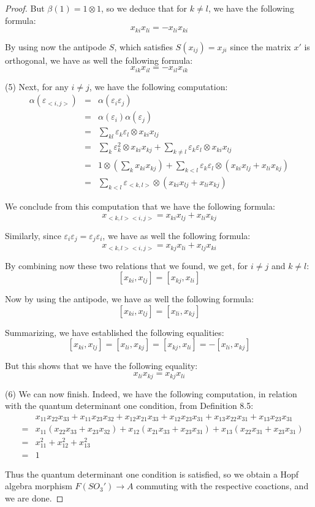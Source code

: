 \documentclass[10pt,a4paper]{amsart}
\begin{document}
\begin{proof}
But $\beta(1)=1\otimes1$, so we deduce that for $k\neq l$, we have the following formula:
$$x_{ki}x_{li}=-x_{li}x_{ki}$$

By using now the antipode $S$, which satisfies $S(x_{ij})=x_{ji}$ since the matrix $x'$ is orthogonal, we have as well the following formula:
$$x_{ik}x_{il}=-x_{il}x_{ik}$$

(5) Next, for any $i\neq j$, we have the following computation:
\begin{eqnarray*}
\alpha(\varepsilon_{<i,j>})
&=&\alpha(\varepsilon_i \varepsilon_j)\\
&=&\alpha(\varepsilon_i)\alpha(\varepsilon_j)\\
&=&\sum_{kl}\varepsilon_k\varepsilon_l\otimes x_{ki}x_{lj}\\
&=&\sum_k\varepsilon_k^2\otimes x_{ki}x_{kj}+\sum_{k \neq l}\varepsilon_k\varepsilon_l\otimes
 x_{ki}x_{lj}\\
&=&1\otimes\left(\sum_kx_{ki}x_{kj}\right)+\sum_{k<l}\varepsilon_k\varepsilon_l\otimes(x_{ki}x_{lj}+x_{li}x_{kj})\\
&=&\sum_{k<l}\varepsilon_{<k,l>}\otimes(x_{ki}x_{lj}+x_{li}x_{kj})
\end{eqnarray*}

We conclude from this computation that we have the following formula:
$$x_{<k,l><i,j>}=x_{ki}x_{lj}+x_{li}x_{kj}$$

Similarly, since $\varepsilon_i\varepsilon_j=\varepsilon_j\varepsilon_i$, we have as well the following formula:
$$x_{<k,l><i,j>}=x_{kj}x_{li}+x_{lj}x_{ki}$$
 
By combining now these two relations that we found, we get, for $i\neq j$ and $k\neq l$:
$$[x_{ki},x_{lj}]=[x_{kj},x_{li}]$$

Now by using the antipode, we have as well the following formula:
$$[x_{ki},x_{lj}]=[x_{li},x_{kj}]$$

Summarizing, we have established the following equalities:
$$[x_{ki},x_{lj}]=[x_{li},x_{kj}]=[x_{kj},x_{li}]=-[x_{li},x_{kj}]$$

But this shows that we have the following equality:
$$x_{li}x_{kj} = x_{kj}x_{li}$$

(6) We can now finish. Indeed, we have the following computation, in relation with the quantum determinant one condition, from Definition 8.5:
\begin{eqnarray*}
&&x_{11}x_{22}x_{33}+x_{11}x_{23}x_{32}+x_{12}x_{21}x_{33}+x_{12}x_{23}x_{31}+x_{13}x_{22}x_{31}+x_{13}x_{23}x_{31}\\
&=&x_{11}(x_{22}x_{33}+x_{23}x_{32})+x_{12}(x_{21}x_{33}+x_{23}x_{31})+x_{13}(x_{22}x_{31} +x_{23}x_{31})\\
&=&x_{11}^2+x_{12}^2+x_{13}^2\\
&=&1
\end{eqnarray*}

Thus the quantum determinant one condition is satisfied, so we obtain a Hopf algebra morphism 
$F(SO_3') \to A$ commuting with the respective coactions, and we are done.
\end{proof}
\end{document}
